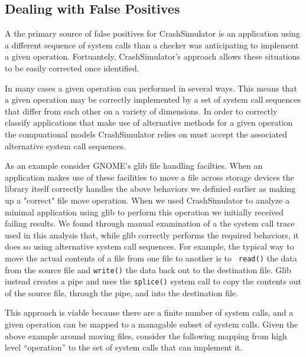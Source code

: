     \subsection{Dealing with False Positives}

    A the primary source of false positives for CrashSimulator is an application using a different sequence of system
    calls than a checker was anticipating to implement a given operation.  Fortuantely, CrashSimulator's approach allows
    these situations to be easily corrected once identified.

    In many cases a given operation can performed in several ways.  This means that a given operation may be correctly
    implemented by a set of system call sequences that differ from each other on a variety of dimensions.  In order to
    correctly classify applications that make use of alternative methods for a given operation the compuational models
    CrashSimulator relies on must accept the associated alternative system call sequences.

    As an example consider GNOME's glib file handling facilties.  When an application makes use of these facilities to move
    a file across storage devices the library itself correctly handles the above behaviors we definied earlier as making up
    a "correct" file move operation.  When we used CrashSimulator to analyze a minimal application using glib to perform
    this operation we initially received failing results.  We found through manual examination of a the system call trace
    used in this analysis that, while glib correctly performs the required behaviors, it does so using alternative system
    call sequences.  For example, the typical way to move the actual contents of a file from one file to another is to {\tt
      read()} the data from the source file and {\tt write()} the data back out to the destination file.  Glib instead
    creates a pipe and uses the {\tt splice()} system call to copy the contents out of the source file, through the pipe,
    and into the destination file.

    This approach is viable because there are a finite number of system calls, and a given operation can be mapped to a
    managable subset of system calls.  Given the above example around moving files, consider the following mapping from
    high level ``operation'' to the set of system calls that can implement it.

